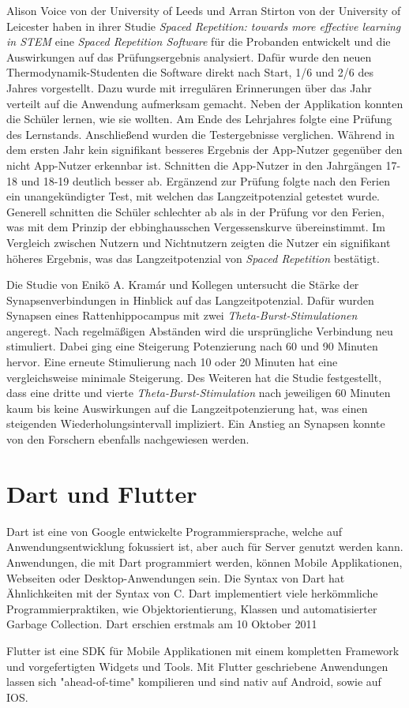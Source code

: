 Alison Voice von der University of Leeds und Arran Stirton von der University of Leicester haben in ihrer Studie \textit{Spaced Repetition: towards more effective learning in STEM} eine \textit{Spaced Repetition Software} für die Probanden entwickelt und die Auswirkungen auf das Prüfungsergebnis analysiert. Dafür wurde den neuen Thermodynamik-Studenten die Software direkt nach Start, 1/6 und 2/6 des Jahres vorgestellt. Dazu wurde mit irregulären Erinnerungen über das Jahr verteilt auf die Anwendung aufmerksam gemacht. Neben der Applikation konnten die Schüler lernen, wie sie wollten. Am Ende des Lehrjahres folgte eine Prüfung des Lernstands. Anschließend wurden die Testergebnisse verglichen. Während in dem ersten Jahr kein signifikant besseres Ergebnis der App-Nutzer gegenüber den nicht App-Nutzer erkennbar ist. Schnitten die App-Nutzer in den Jahrgängen 17-18 und 18-19 deutlich besser ab. Ergänzend zur Prüfung folgte nach den Ferien ein unangekündigter Test, mit welchen das Langzeitpotenzial getestet wurde. Generell schnitten die Schüler schlechter ab als in der Prüfung vor den Ferien, was mit dem Prinzip der ebbinghausschen Vergessenskurve übereinstimmt. Im Vergleich zwischen Nutzern und Nichtnutzern zeigten die Nutzer ein signifikant höheres Ergebnis, was das Langzeitpotenzial von \textit{Spaced Repetition} bestätigt.\cite{RD:SpacedRepetition}

Die Studie von Enikö A. Kramár und Kollegen untersucht die Stärke der Synapsenverbindungen in Hinblick auf das Langzeitpotenzial. Dafür wurden Synapsen eines Rattenhippocampus mit zwei \textit{Theta-Burst-Stimulationen} angeregt. Nach regelmäßigen Abständen wird die ursprüngliche Verbindung neu stimuliert. Dabei ging eine Steigerung Potenzierung nach 60 und 90 Minuten hervor. Eine erneute Stimulierung nach 10 oder 20 Minuten hat eine vergleichsweise minimale Steigerung. Des Weiteren hat die Studie festgestellt, dass eine dritte und vierte \textit{Theta-Burst-Stimulation} nach jeweiligen 60 Minuten kaum bis keine Auswirkungen auf die Langzeitpotenzierung hat, was einen steigenden Wiederholungsintervall impliziert. Ein Anstieg an Synapsen konnte von den Forschern ebenfalls nachgewiesen werden.\cite{PNAS:Synaptic}

\section{Dart und Flutter}
Dart ist eine von Google entwickelte Programmiersprache, welche auf Anwendungsentwicklung fokussiert ist, aber auch für Server genutzt werden kann. Anwendungen, die mit Dart programmiert werden, können Mobile Applikationen, Webseiten oder Desktop-Anwendungen sein. Die Syntax von Dart hat Ähnlichkeiten mit der Syntax von C. Dart implementiert viele herkömmliche Programmierpraktiken, wie Objektorientierung, Klassen und automatisierter Garbage Collection. 
Dart erschien erstmals am 10 Oktober 2011\par

Flutter ist eine SDK für Mobile Applikationen mit einem kompletten Framework und vorgefertigten Widgets und Tools. Mit Flutter geschriebene Anwendungen lassen sich "ahead-of-time" kompilieren und sind nativ auf Android, sowie auf IOS.
